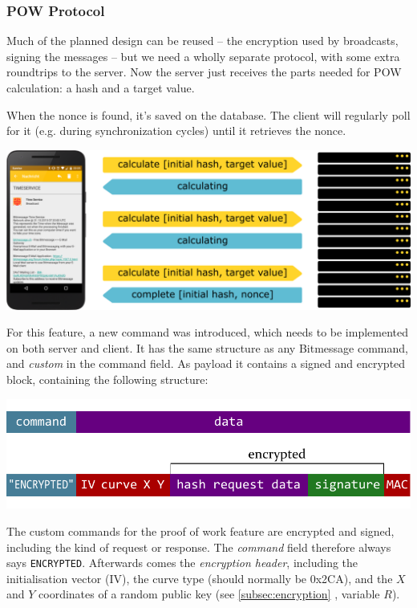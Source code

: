 \documentclass{bfh}
\begin{document}
  \subsubsection{\ac{POW} Protocol}
  Much of the planned design can be reused -- the encryption used by broadcasts, signing the messages -- but we need a wholly separate protocol, with some extra roundtrips to the server. Now the server just receives the parts needed for \ac{POW} calculation: a hash and a target value.

  When the nonce is found, it's saved on the database. The client will regularly poll for it (e.g. during synchronization cycles) until it retrieves the nonce.

  \includegraphics[width=\textwidth]{images/server_pow_protocol.pdf}

  For this feature, a new command was introduced, which needs to be implemented on both server and client. It has the same structure as any Bitmessage command, and \textit{custom} in the command field. As payload it contains a signed and encrypted block, containing the following structure:

  \includegraphics[width=\textwidth]{images/custom_message.pdf}

  The custom commands for the proof of work feature are encrypted and signed, including the kind of request or response. The \textit{command} field therefore always says \texttt{ENCRYPTED}. Afterwards comes the \textit{encryption header}, including the initialisation vector (IV), the curve type (should normally be 0x2CA), and the $X$ and $Y$ coordinates of a random public key (see \ref{subsec:encryption} , variable $R$).
\end{document}
